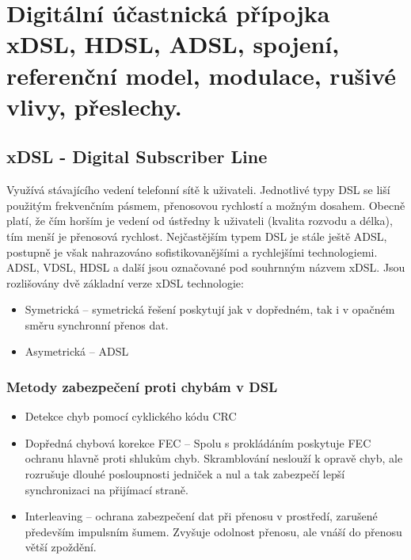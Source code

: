 \clearpage
\section{Digitální účastnická přípojka xDSL, HDSL, ADSL, spojení, referenční model, modulace, rušivé vlivy, přeslechy.}
\subsection{xDSL - Digital Subscriber Line}

Využívá stávajícího vedení telefonní sítě k uživateli. Jednotlivé typy DSL se liší použitým frekvenčním pásmem, přenosovou
rychlostí a možným dosahem. Obecně platí, že čím horším je vedení od ústředny k uživateli (kvalita
rozvodu a délka), tím menší je přenosová rychlost. Nejčastějším typem DSL je stále ještě ADSL, postupně je však nahrazováno
sofistikovanějšími a rychlejšími technologiemi. ADSL, VDSL, HDSL a další jsou označované pod souhrnným názvem xDSL. Jsou rozlišovány dvě základní verze xDSL technologie:
\begin{itemize}
    \item Symetrická -- symetrická řešení poskytují jak v dopředném, tak i v opačném směru synchronní přenos dat.
    \item Asymetrická -- ADSL
\end{itemize}

\subsubsection{Metody zabezpečení proti chybám v DSL}
\begin{itemize}
    \item Detekce chyb pomocí cyklického kódu CRC
    \item Dopředná chybová korekce FEC -- Spolu s prokládáním poskytuje FEC ochranu hlavně proti shlukům chyb. Skramblování neslouží k opravě chyb, ale rozrušuje dlouhé posloupnosti jedniček a nul a tak zabezpečí lepší synchronizaci na přijímací straně.
    \item Interleaving -- ochrana zabezpečení dat při přenosu v prostředí, zarušené především impulsním šumem. Zvyšuje odolnost přenosu, ale vnáší do přenosu větší zpoždění.
\end{itemize}

